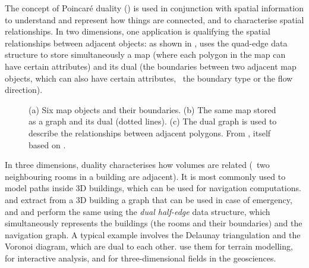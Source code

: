 The concept of Poincar\'e duality () is used in conjunction with spatial information to understand and represent how things are connected, and to characterise spatial relationships.
In two dimensions, one application is qualifying the spatial relationships between adjacent objects: as shown in , \citet{Gold91} uses the quad-edge data structure \citep{Guibas85} to store simultaneously a map (where each polygon in the map can have certain attributes) and its dual (the boundaries between two adjacent map objects, which can also have certain attributes, \eg\ the boundary type or the flow direction).
\begin{figure}[tb]
\centering
{}
{}
{}
\caption[Duality in a 2D map]{(a) Six map objects and their boundaries.
(b) The same map stored as a graph and its dual (dotted lines).
(c) The dual graph is used to describe the relationships between adjacent polygons.
From \citet[Ch.~6]{Ledoux06}, itself based on \citet{Gold91}.}
\label{fig:dual_polygonal_map}
\end{figure}

In three dimensions, duality characterises how volumes are related (\eg\ two neighbouring rooms in a building are adjacent).
It is most commonly used to model paths inside 3D buildings, which can be used for navigation computations.
\citet{Lee08} and \citet{Lee08a} extract from a 3D building a graph that can be used in case of emergency, and \citet{Boguslawski11a} and \citet{Boguslawski11} perform the same using the \emph{dual half-edge} data structure, which simultaneously represents the buildings (the rooms and their boundaries) and the navigation graph.
A typical example involves the Delaunay triangulation and the Voronoi diagram, which are dual to each other.
\citet{Dakowicz03} use them for terrain modelling, \citet{Lee02} for interactive analysis, and \citet{Ledoux08} for three-dimensional fields in the geosciences.

